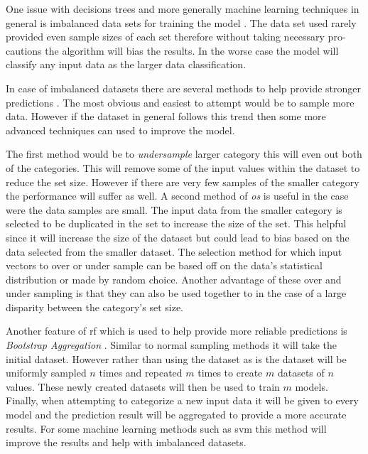One issue with decisions trees and more generally machine learning techniques in general is imbalanced data sets for training the model \cite{Khoshgoftaar2007}. The data set used rarely provided even sample sizes of each set therefore without taking necessary pro-cautions the algorithm will bias the results. In the worse case the model will classify any input data as the larger data classification.

In case of imbalanced datasets there are several methods to help provide stronger predictions \cite{Khoshgoftaar2007}. The most obvious and easiest to attempt would be to sample more data. However if the dataset in general follows this trend then some more advanced techniques can used to improve the model.

 
The first method would be to \textit{undersample} larger category this will even out both of the categories. This will remove some of the input values within the dataset to reduce the set size. However if there are very few samples of the smaller category the performance will suffer as well. A second method of \textit{\gls{os}} is useful in the case were the data samples are small. The input data from the smaller category is selected to be duplicated in the set to increase the size of the set. This helpful since it will increase the size of the dataset but could lead to bias based on the data selected from the smaller dataset. The selection method for which input vectors to over or under sample can be based off on the data's statistical distribution or made by random choice. Another advantage of these over and under sampling is that they can also be used together to in the case of a large disparity between the category's set size. 

Another feature of \gls{rf} which is used to help provide more reliable predictions is \textit{Bootstrap Aggregation} \cite{Westland2011}. Similar to normal sampling methods it will take the initial dataset. However rather than using the dataset as is the dataset will be uniformly sampled $n$ times and repeated $m$ times to create $m$ datasets of $n$ values. These newly created datasets will then be used to train $m$ models. Finally, when attempting to categorize a new input data it will be given to every model and the prediction result will be aggregated to provide a more accurate results. For some machine learning methods such as \gls{svm} this method will improve the results and help with imbalanced datasets.

